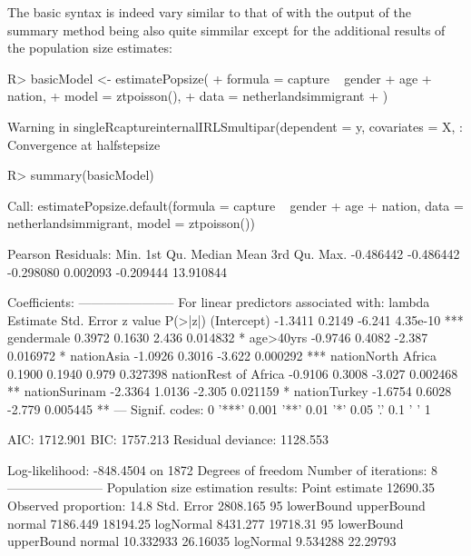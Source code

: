 \documentclass[
]{jss}
\newcommand{\1}{\mathcal{I}} \newcommand{\bx}{\boldsymbol{x}}
\begin{document}
The basic syntax is indeed vary similar to that of  with the
output of the summary method being also quite simmilar except for the
additional results of the population size estimates:

\begin{CodeChunk}
\begin{CodeInput}
R> basicModel <- estimatePopsize(
+   formula = capture ~ gender + age + nation,
+   model   = ztpoisson(),
+   data    = netherlandsimmigrant
+ )
\end{CodeInput}
\begin{CodeOutput}
Warning in singleRcaptureinternalIRLSmultipar(dependent = y, covariates = X, :
Convergence at halfstepsize
\end{CodeOutput}
\begin{CodeInput}
R> summary(basicModel)
\end{CodeInput}
\begin{CodeOutput}

Call:
estimatePopsize.default(formula = capture ~ gender + age + nation, 
    data = netherlandsimmigrant, model = ztpoisson())

Pearson Residuals:
     Min.   1st Qu.    Median      Mean   3rd Qu.      Max. 
-0.486442 -0.486442 -0.298080  0.002093 -0.209444 13.910844 

Coefficients:
-----------------------
For linear predictors associated with: lambda 
                     Estimate Std. Error z value  P(>|z|)    
(Intercept)           -1.3411     0.2149  -6.241 4.35e-10 ***
gendermale             0.3972     0.1630   2.436 0.014832 *  
age>40yrs             -0.9746     0.4082  -2.387 0.016972 *  
nationAsia            -1.0926     0.3016  -3.622 0.000292 ***
nationNorth Africa     0.1900     0.1940   0.979 0.327398    
nationRest of Africa  -0.9106     0.3008  -3.027 0.002468 ** 
nationSurinam         -2.3364     1.0136  -2.305 0.021159 *  
nationTurkey          -1.6754     0.6028  -2.779 0.005445 ** 
---
Signif. codes:  0 '***' 0.001 '**' 0.01 '*' 0.05 '.' 0.1 ' ' 1

AIC: 1712.901
BIC: 1757.213
Residual deviance: 1128.553

Log-likelihood: -848.4504 on 1872 Degrees of freedom 
Number of iterations: 8
-----------------------
Population size estimation results: 
Point estimate 12690.35
Observed proportion: 14.8%
Std. Error 2808.165
95%
          lowerBound upperBound
normal      7186.449   18194.25
logNormal   8431.277   19718.31
95%
          lowerBound upperBound
normal     10.332933   26.16035
logNormal   9.534288   22.29793
\end{CodeOutput}
\end{CodeChunk}
\end{document}
